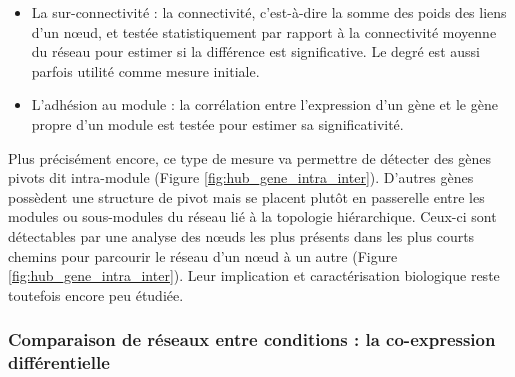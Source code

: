 \begin{itemize}
    \item La sur-connectivité \cite{Das2017} : la connectivité, c’est-à-dire la somme des poids des liens d'un nœud, et testée statistiquement par rapport à la connectivité moyenne du réseau pour estimer si la différence est significative. Le degré est aussi parfois utilité comme mesure initiale.
    \item L'adhésion au module \cite{Horvath2008} : la corrélation entre l'expression d'un gène et le gène propre d'un module est testée pour estimer sa significativité.
\end{itemize}

Plus précisément encore, ce type de mesure va permettre de détecter des gènes pivots dit intra-module (Figure \ref{fig:hub_gene_intra_inter}). D'autres gènes possèdent une structure de pivot mais se placent plutôt en passerelle entre les modules ou sous-modules du réseau lié à la topologie hiérarchique. Ceux-ci sont détectables par une analyse des nœuds les plus présents dans les plus courts chemins pour parcourir le réseau d'un nœud à un autre (Figure \ref{fig:hub_gene_intra_inter}). Leur implication et caractérisation biologique reste toutefois encore peu étudiée.


\subsubsection{Comparaison de réseaux entre conditions : la co-expression différentielle}


